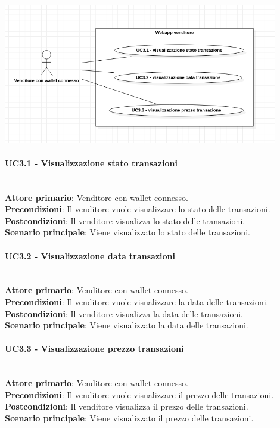 \documentclass[a4paper, 12pt]{article}
\begin{document}
\includegraphics[width=0.9\textwidth]{UC3D}

\paragraph{UC3.1 - Visualizzazione stato transazioni}\\
\textbf{Attore primario}: Venditore con wallet connesso.\\
\textbf{Precondizioni}: Il venditore vuole visualizzare lo stato delle transazioni.\\
\textbf{Postcondizioni}: Il venditore visualizza lo stato delle transazioni.\\
\textbf{Scenario principale}: Viene visualizzato lo stato delle transazioni.\\

\paragraph{UC3.2 - Visualizzazione data transazioni}\\
\textbf{Attore primario}: Venditore con wallet connesso.\\
\textbf{Precondizioni}: Il venditore vuole visualizzare la data delle transazioni.\\
\textbf{Postcondizioni}: Il venditore visualizza la data delle transazioni.\\
\textbf{Scenario principale}: Viene visualizzato la data delle transazioni.\\

\paragraph{UC3.3 - Visualizzazione prezzo transazioni}\\
\textbf{Attore primario}: Venditore con wallet connesso.\\
\textbf{Precondizioni}: Il venditore vuole visualizzare il prezzo delle transazioni.\\
\textbf{Postcondizioni}: Il venditore visualizza il prezzo delle transazioni.\\
\textbf{Scenario principale}: Viene visualizzato il prezzo delle transazioni.\\
\end{document}
